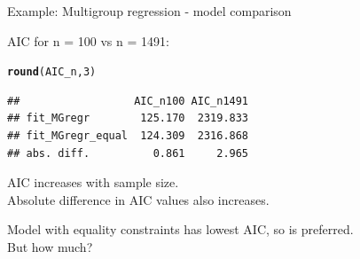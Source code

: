 \documentclass[10pt]{beamer}\usepackage[]{graphicx}\usepackage[]{xcolor}
\makeatletter
\newcommand{\hlnum}[1]{\textcolor[rgb]{0.686,0.059,0.569}{#1}}%
\newcommand{\hlstd}[1]{\textcolor[rgb]{0.345,0.345,0.345}{#1}}%
\newcommand{\hlkwd}[1]{\textcolor[rgb]{0.737,0.353,0.396}{\textbf{#1}}}%
\newenvironment{kframe}{%
 \def\at@end@of@kframe{}%
 \ifinner\ifhmode%
  \def\at@end@of@kframe{\end{minipage}}%
  \begin{minipage}{\columnwidth}%
 \fi\fi%
 \def\FrameCommand##1{\hskip\@totalleftmargin \hskip-\fboxsep
 \colorbox{shadecolor}{##1}\hskip-\fboxsep
     \hskip-\linewidth \hskip-\@totalleftmargin \hskip\columnwidth}%
 \MakeFramed {\advance\hsize-\width
   \@totalleftmargin\z@ \linewidth\hsize
   \@setminipage}}%
 {\par\unskip\endMakeFramed%
 \at@end@of@kframe}
\newenvironment{knitrout}{}{} %
\makeatother
\begin{document}
%
%
\begin{frame}[fragile]{Example: Multigroup regression - model comparison}

AIC for n = 100 vs n = 1491: %



\begin{knitrout}
\color{fgcolor}\begin{kframe}
\begin{alltt}
\hlkwd{round}\hlstd{(AIC_n,} \hlnum{3}\hlstd{)}
\end{alltt}
\begin{verbatim}
##                  AIC_n100 AIC_n1491
## fit_MGregr        125.170  2319.833
## fit_MGregr_equal  124.309  2316.868
## abs. diff.          0.861     2.965
\end{verbatim}
\end{kframe}
\end{knitrout}

AIC increases with sample size.\\
Absolute difference in AIC values also increases.\\

\vspace{\baselineskip}

Model with equality constraints has lowest AIC, so is preferred.\\
But how much?

\end{frame}
%
\end{document}
